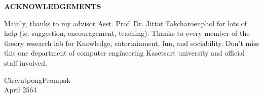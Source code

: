 \justify

\smallskip
{\centering
    \large\bfseries {ACKNOWLEDGEMENTS} \par%
}

Mainly, thanks to my advisor Asst. Prof. Dr. Jittat Fakcharoenphol
for lots of help (ie. suggestion, encouragement, teaching).
Thanks to every member of the theory research lab for 
Knowledge, entertainment, fun, and sociability.
Don't miss this one department of computer engineering Kasetsart university 
and official staff involved.

\begin{flushright}
    Chayutpong\space\space Prompak \\
    April 2564
\end{flushright}